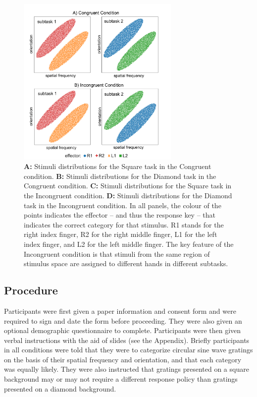 \documentclass[doc, floatsintext]{apa7}
\begin{document}
\begin{figure}[h!]
    \centering
    \includegraphics[width=0.7\textwidth]{../figures/fig_categories_stim_space.png}
    \caption{
        \textbf{A:} Stimuli distributions for the Square task in the Congruent condition.
        \textbf{B:} Stimuli distributions for the Diamond task in the Congruent condition.
        \textbf{C:} Stimuli distributions for the Square task in the Incongruent condition.
        \textbf{D:} Stimuli distributions for the Diamond task in the Incongruent condition.
        In all panels, the colour of the points indicates
        the effector -- and thus the response key -- that
        indicates the correct category for that stimulus. R1
        stands for the right index finger, R2 for the right
        middle finger, L1 for the left index finger, and L2
        for the left middle finger. The key feature of the
        Incongruent condition is that stimuli from the same
        region of stimulus space are assigned to different
        hands in different subtasks.
    }
    \label{fig_2}
\end{figure}

\subsection{Procedure}
Participants were first given a paper information and
consent form and were required to sign and date the form
before proceeding. They were also given an optional
demographic questionnaire to complete. Participants were
then given verbal instructions with the aid of slides (see
the Appendix). Briefly  participants in all conditions were
told that they were to categorize circular sine wave
gratings on the basis of their spatial frequency and
orientation, and that each category was equally likely.
They were also instructed that gratings presented on a
square background may or may not require a different
response policy than gratings presented on a diamond
background. 
\end{document}
